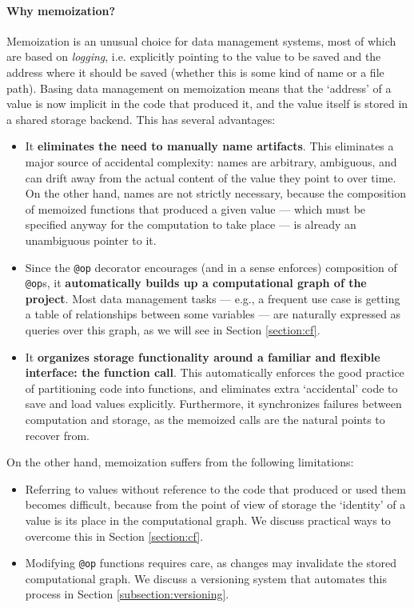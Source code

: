 \paragraph{Why memoization?} Memoization is an unusual choice for data
management systems, most of which are based on \emph{logging}, i.e. explicitly
pointing to the value to be saved and the address where it should be saved
(whether this is some kind of name or a file path). Basing data management on
memoization means that the `address' of a value is now implicit in the code that
produced it, and the value itself is stored in a shared storage backend. This has several advantages:
\begin{itemize}
\item It \textbf{eliminates the need to manually name artifacts}. This
eliminates a major source of accidental complexity: names are arbitrary,
ambiguous, and can drift away from the actual content of the value they point to
over time. On the other hand, names are not strictly necessary, because the
composition of memoized functions that produced a given value --- which must be
specified anyway for the computation to take place --- is already an unambiguous
pointer to it.
\item Since the \texttt{@op} decorator encourages (and in a sense enforces)
composition of \texttt{@op}s, it \textbf{automatically builds up a computational
graph of the project}. Most data management tasks --- e.g., a frequent use case
is getting a table of relationships between some variables --- are naturally
expressed as queries over this graph, as we will see in Section
\ref{section:cf}.
\item It \textbf{organizes storage functionality around a familiar and flexible
interface: the function call}. This automatically enforces the good practice
of partitioning code into functions, and eliminates extra `accidental' code to
save and load values explicitly. Furthermore, it synchronizes failures between
computation and storage, as the memoized calls are the natural points to
recover from.
\end{itemize}

On the other hand, memoization suffers from the following limitations:
\begin{itemize}
\item Referring to values without reference to the code that produced or used
them becomes difficult, because from the point of view of storage the `identity'
of a value is its place in the computational graph. We discuss practical ways to
overcome this in Section \ref{section:cf}.
\item Modifying \texttt{@op} functions requires care, as changes may invalidate
the stored computational graph. We discuss a versioning system that automates this process in Section \ref{subsection:versioning}.
\end{itemize}

